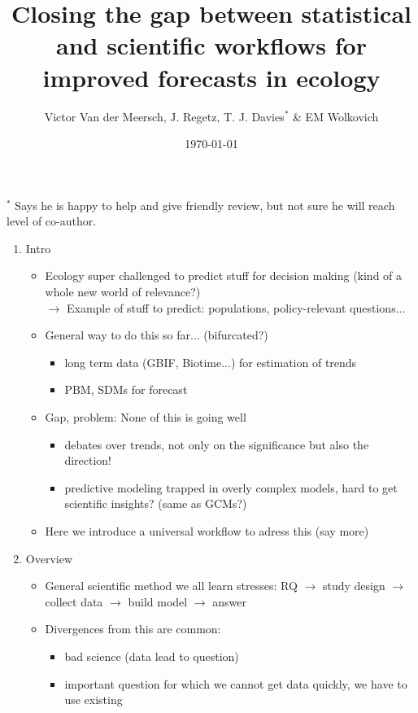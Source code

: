 \documentclass[11pt]{article}
\begin{document}
\renewcommand{\refname}{\CHead{}}

\title{Closing the gap between statistical and scientific workflows for improved forecasts in ecology } 
\date{\today}
\author{Victor Van der Meersch, J. Regetz, T. J. Davies$^*$ \& EM Wolkovich}
\maketitle
$^*$ Says he is happy to help and give friendly review, but not sure he will reach level of co-author. 

\begin{enumerate}
\item Intro
\begin{itemize}
\item Ecology super challenged to predict stuff for decision making (kind of a whole new world of relevance?)\\
$\rightarrow$ Example of stuff to predict: populations, policy-relevant questions...
\item General way to do this so far... (bifurcated?)
\begin{itemize}
\item long term data (GBIF, Biotime...) for estimation of trends
\item PBM, SDMs for forecast
\end{itemize}
\item Gap, problem: None of this is going well
\begin{itemize}
\item debates over trends, not only on the significance but also the direction!
\item predictive modeling trapped in overly complex models, hard to get scientific insights? (same as GCMs?)
\end{itemize}
\item Here we introduce a universal workflow to adress this (say more)
\end{itemize}
\item Overview
\begin{itemize}
\item General scientific method we all learn stresses: RQ $\rightarrow$ study design $\rightarrow$ collect data $\rightarrow$ build model $\rightarrow$ answer
\item Divergences from this are common: 
\begin{itemize}
\item bad science (data lead to question)
\item important question for which we cannot get data quickly, we have to use existing

\end{itemize}
\end{itemize}
\end{enumerate}
\end{document}
